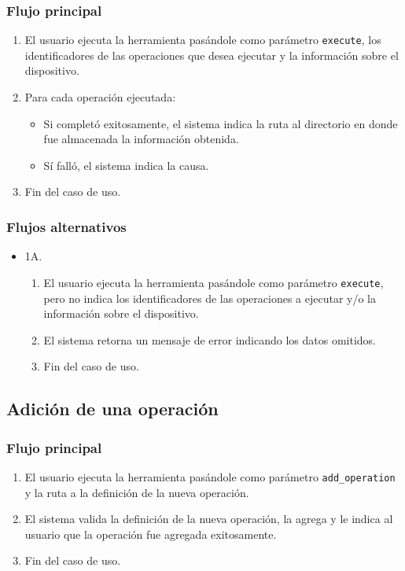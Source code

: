 \subsubsection*{Flujo principal}
\begin{enumerate}
\item \begin{sloppypar} El usuario ejecuta la herramienta pasándole como parámetro \texttt{execute}, los identificadores de las operaciones que desea ejecutar y la información sobre el dispositivo.\end{sloppypar}
\item Para cada operación ejecutada:
    \begin{itemize}
    \item Si completó exitosamente, el sistema indica la ruta al directorio en donde fue almacenada la información obtenida.
    \item Sí falló, el sistema indica la causa.
    \end{itemize}
\item Fin del caso de uso.
\end{enumerate}

\subsubsection*{Flujos alternativos}
\begin{itemize}
\item 1A.
    \begin{enumerate}
    \item \begin{sloppypar} El usuario ejecuta la herramienta pasándole como parámetro \texttt{execute}, pero no indica los identificadores de las operaciones a ejecutar y/o la información sobre el dispositivo.\end{sloppypar}
    \item El sistema retorna un mensaje de error indicando los datos omitidos.
    \item Fin del caso de uso.
    \end{enumerate}
\end{itemize}

\subsection{Adición de una operación}

\subsubsection*{Flujo principal}
\begin{enumerate}
\item \begin{sloppypar} El usuario ejecuta la herramienta pasándole como parámetro \texttt{add\_operation} y la ruta a la definición de la nueva operación.\end{sloppypar}
\item El sistema valida la definición de la nueva operación, la agrega y le indica al usuario que la operación fue agregada exitosamente.
\item Fin del caso de uso.
\end{enumerate}

